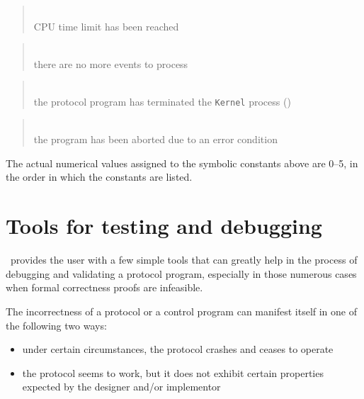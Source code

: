 \begin{quote}
\noindent{}\\ \hspace{0in}
CPU time limit has been reached
\end{quote}

\begin{quote}
\noindent{}\\ \hspace{0in}
there are no more events to process
\end{quote}

\begin{quote}
\noindent{}\\ \hspace{0in}
the protocol program has terminated the {\tt Kernel} process ()
\end{quote}

\begin{quote}
\noindent{}\\ \hspace{0in}
the program has been aborted due to an error condition
\end{quote}\medskip

The actual numerical values assigned to the symbolic constants above
are 0--5, in the order in which the constants are listed.

\section{Tools for testing and debugging}
\label{rm_ob}

\smurph\ provides the user with a few simple tools that can greatly help in the
process of debugging and validating a protocol program, especially in those
numerous cases when formal correctness proofs are infeasible.

The incorrectness of a protocol or a control program
can manifest itself in one of the following two ways:
\begin{itemize}
\item
under certain circumstances, the protocol crashes and ceases to operate
\item
the protocol seems to work, but it does not exhibit certain properties
expected by the designer and/or implementor
\end{itemize}


